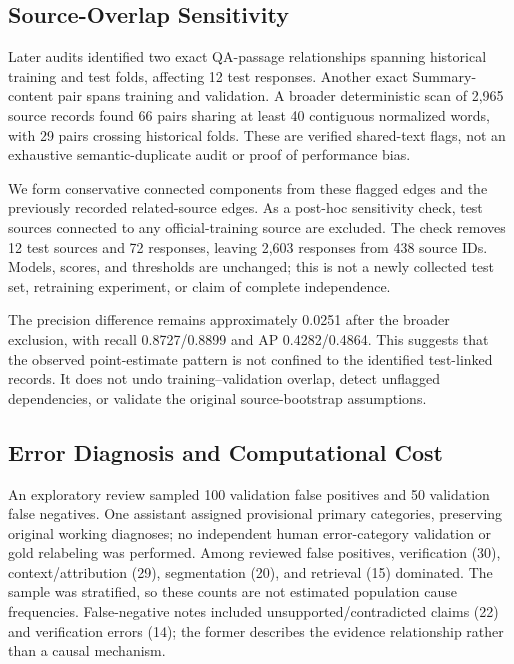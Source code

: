 \documentclass[conference,a4paper]{IEEEtran}
\begin{document}


\subsection{Source-Overlap Sensitivity}\label{sec:overlap}
Later audits identified two exact QA-passage relationships spanning historical training and test folds, affecting 12 test responses. Another exact Summary-content pair spans training and validation. A broader deterministic scan of 2,965 source records found 66 pairs sharing at least 40 contiguous normalized words, with 29 pairs crossing historical folds. These are verified shared-text flags, not an exhaustive semantic-duplicate audit or proof of performance bias.

We form conservative connected components from these flagged edges and the previously recorded related-source edges. As a post-hoc sensitivity check, test sources connected to any official-training source are excluded. The check removes 12 test sources and 72 responses, leaving 2,603 responses from 438 source IDs. Models, scores, and thresholds are unchanged; this is not a newly collected test set, retraining experiment, or claim of complete independence.



The precision difference remains approximately 0.0251 after the broader exclusion, with recall 0.8727/0.8899 and AP 0.4282/0.4864. This suggests that the observed point-estimate pattern is not confined to the identified test-linked records. It does not undo training--validation overlap, detect unflagged dependencies, or validate the original source-bootstrap assumptions.

\subsection{Error Diagnosis and Computational Cost}
An exploratory review sampled 100 validation false positives and 50 validation false negatives. One assistant assigned provisional primary categories, preserving original working diagnoses; no independent human error-category validation or gold relabeling was performed. Among reviewed false positives, verification (30), context/attribution (29), segmentation (20), and retrieval (15) dominated. The sample was stratified, so these counts are not estimated population cause frequencies. False-negative notes included unsupported/contradicted claims (22) and verification errors (14); the former describes the evidence relationship rather than a causal mechanism.
\end{document}
